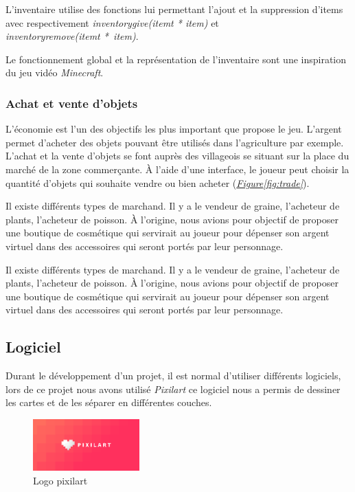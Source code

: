 \documentclass{article}
\begin{document}
       L'inventaire utilise des fonctions lui permettant l'ajout et la suppression d'items avec respectivement \textit{inventory\textunderscore give(item\textunderscore t * item)} et \\ \textit{inventory\textunderscore remove(item\textunderscore t *~item)}. 
        
Le fonctionnement global et la représentation de l'inventaire sont une inspiration du jeu vidéo \textit{Minecraft}.

        \newpage
        
        \subsubsection{Achat et vente d'objets}
L'économie est l'un des objectifs les plus important que propose le jeu. L'argent permet d'acheter des objets pouvant être utilisés dans l'agriculture par exemple. L'achat et la vente d'objets se font auprès des villageois se situant sur la place du marché de la zone commerçante. À l'aide d'une interface, le joueur peut choisir la quantité d'objets qui souhaite vendre ou bien acheter (\textit{\hyperref[fig:trade]{Figure\ref{fig:trade}}}).
        
Il existe différents types de marchand. Il y a le vendeur de graine, l'acheteur de plants, l'acheteur de poisson. À l'origine, nous avions pour objectif de proposer une boutique de cosmétique qui servirait au joueur pour dépenser son argent virtuel dans des accessoires qui seront portés par leur personnage.

Il existe différents types de marchand. Il y a le vendeur de graine, l'acheteur de plants, l'acheteur de poisson. À l'origine, nous avions pour objectif de proposer une boutique de cosmétique qui servirait au joueur pour dépenser son argent virtuel dans des accessoires qui seront portés par leur personnage.
\newpage
\subsection{Logiciel}
Durant le développement d'un projet, il est normal d'utiliser différents logiciels, lors de ce projet nous avons utilisé \textit{Pixilart} ce logiciel nous a permis de dessiner les cartes et de les séparer en différentes couches.
    
    \begin{figure}[h]  
        \includegraphics[height = 2cm]{pixilart.png}
        \centering
        \caption{Logo pixilart}
        \label{fig:logo1}
    \end{figure}
\end{document}

